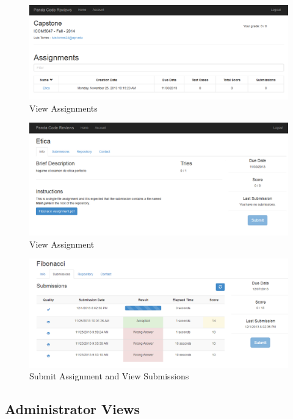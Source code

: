 \begin{figure}[H]
	\centering
	\includegraphics[width=\textwidth]{img/assignments-screen}
	\caption{View Assignments}
\end{figure}

\begin{figure}[H]
	\centering
	\includegraphics[width=\textwidth]{img/assignment-scren}
	\caption{View Assignment}
\end{figure}

\begin{figure}[H]
	\centering
	\includegraphics[width=\textwidth]{img/submission-screen}
	\caption{Submit Assignment and View Submissions}
\end{figure}

\subsection{Administrator Views}

